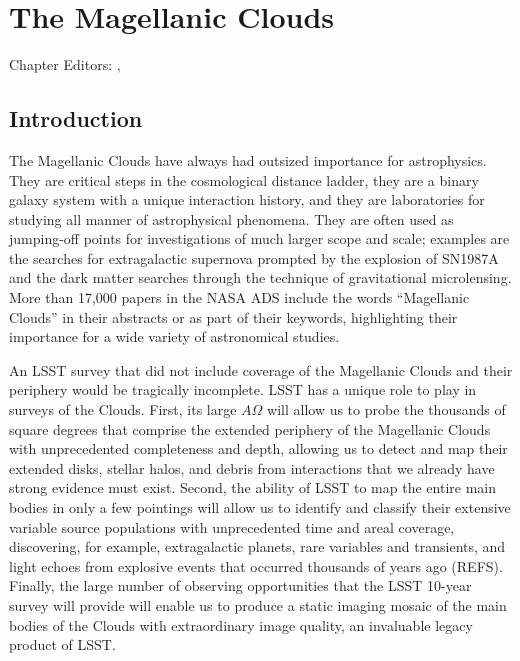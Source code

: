 
\chapter{The Magellanic Clouds}
\def\chpname{MCs}\label{chp:\chpname}

Chapter Editors:
,

%

\section{Introduction}

The Magellanic Clouds have always had outsized importance for
astrophysics.  They are critical steps in the cosmological distance
ladder, they are a binary galaxy system with a unique interaction
history, and they are laboratories for studying all manner of
astrophysical phenomena.  They are often used as jumping-off points
for investigations of much larger scope and scale; examples are the
searches for extragalactic supernova prompted by the explosion of
SN1987A and the dark matter searches through the technique of
gravitational microlensing.  More than 17,000 papers in the NASA ADS
include the words ``Magellanic Clouds'' in their abstracts or as part
of their keywords, highlighting their importance for a wide variety of
astronomical studies.

An LSST survey that did not include coverage of the Magellanic Clouds
and their periphery would be tragically incomplete.  LSST has a unique
role to play in surveys of the Clouds.  First, its large $A\Omega$
will allow us to probe the thousands of square degrees that comprise
the extended periphery of the Magellanic Clouds with unprecedented
completeness and depth, allowing us to detect and map their extended
disks, stellar halos, and debris from interactions that we already
have strong evidence must exist.  Second, the ability of LSST
to map the entire main bodies in only a few pointings will allow us to
identify and classify their extensive variable source populations with
unprecedented time and areal coverage, discovering, for example,
extragalactic planets, rare variables and transients, and light echoes
from explosive events that occurred thousands of years ago (REFS).
Finally, the large number of observing opportunities that the LSST
10-year survey will provide will enable us to produce a static imaging
mosaic of the main bodies of the Clouds with extraordinary image
quality, an invaluable legacy product of LSST.

